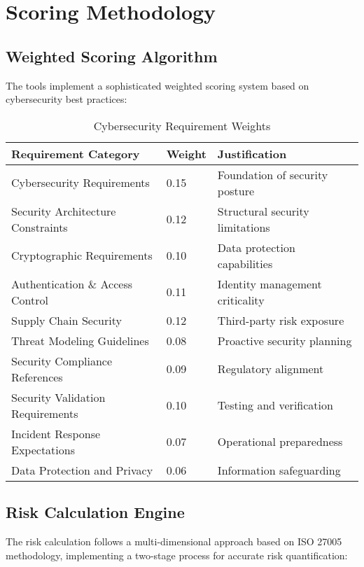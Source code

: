 \documentclass[binding=0.6cm]{sapthesis}
\begin{document}
\section{Scoring Methodology}

\subsection{Weighted Scoring Algorithm}

The tools implement a sophisticated weighted scoring system based on cybersecurity best practices:

\begin{table}[H]
\centering
\caption{Cybersecurity Requirement Weights}
\begin{tabular}{|l|l|l|}
\hline
\textbf{Requirement Category} & \textbf{Weight} & \textbf{Justification} \\ \hline
Cybersecurity Requirements & 0.15 & Foundation of security posture \\ \hline
Security Architecture Constraints & 0.12 & Structural security limitations \\ \hline
Cryptographic Requirements & 0.10 & Data protection capabilities \\ \hline
Authentication \& Access Control & 0.11 & Identity management criticality \\ \hline
Supply Chain Security & 0.12 & Third-party risk exposure \\ \hline
Threat Modeling Guidelines & 0.08 & Proactive security planning \\ \hline
Security Compliance References & 0.09 & Regulatory alignment \\ \hline
Security Validation Requirements & 0.10 & Testing and verification \\ \hline
Incident Response Expectations & 0.07 & Operational preparedness \\ \hline
Data Protection and Privacy & 0.06 & Information safeguarding \\ \hline
\end{tabular}
\end{table}

\subsection{Risk Calculation Engine}

The risk calculation follows a multi-dimensional approach based on ISO 27005 methodology, implementing a two-stage process for accurate risk quantification:
\end{document}
